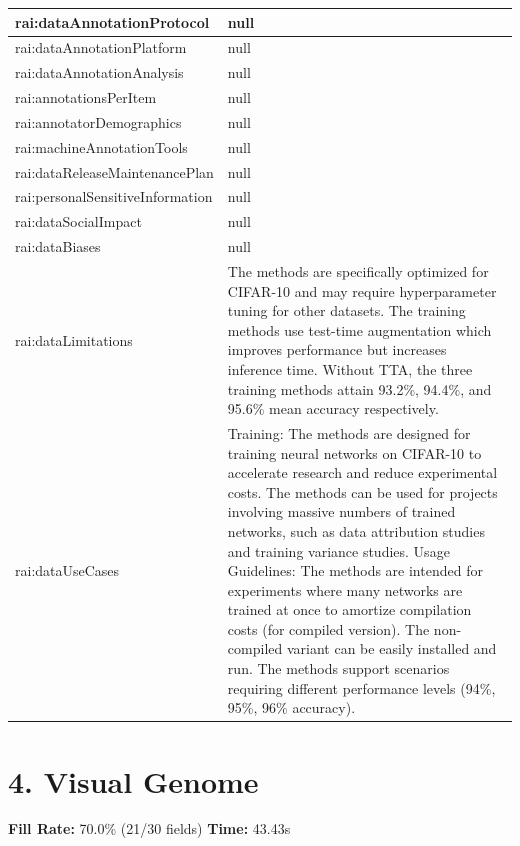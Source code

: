 \documentclass[10pt,a4paper]{article}
\begin{document}
\begin{longtable}{|p{4cm}|p{12cm}|}
\hline
rai:dataAnnotationProtocol & null \\
\hline
rai:dataAnnotationPlatform & null \\
\hline
rai:dataAnnotationAnalysis & null \\
\hline
rai:annotationsPerItem & null \\
\hline
rai:annotatorDemographics & null \\
\hline
rai:machineAnnotationTools & null \\
\hline
rai:dataReleaseMaintenancePlan & null \\
\hline
rai:personalSensitiveInformation & null \\
\hline
rai:dataSocialImpact & null \\
\hline
rai:dataBiases & null \\
\hline
rai:dataLimitations & The methods are specifically optimized for CIFAR-10 and may require hyperparameter tuning for other datasets. The training methods use test-time augmentation which improves performance but increases inference time. Without TTA, the three training methods attain 93.2\%, 94.4\%, and 95.6\% mean accuracy respectively. \\
\hline
rai:dataUseCases & Training: The methods are designed for training neural networks on CIFAR-10 to accelerate research and reduce experimental costs. The methods can be used for projects involving massive numbers of trained networks, such as data attribution studies and training variance studies. Usage Guidelines: The methods are intended for experiments where many networks are trained at once to amortize compilation costs (for compiled version). The non-compiled variant can be easily installed and run. The methods support scenarios requiring different performance levels (94\%, 95\%, 96\% accuracy). \\
\hline
\end{longtable}

\newpage

\section*{4. Visual Genome}
\textbf{Fill Rate:} 70.0\% (21/30 fields) \quad \textbf{Time:} 43.43s
\end{document}
